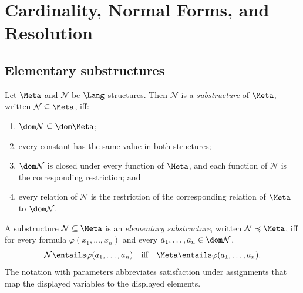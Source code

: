 \chapter{Cardinality, Normal Forms, and Resolution}
\label{ch:fol-cardinality-normalforms}

\section{Elementary substructures}
\label{sec:fol-cardinality-normalforms-01}

\begin{definition}[Substructure]
Let \(\Meta\) and \(\mathcal N\) be \(\Lang\)-structures.  Then
\(\mathcal N\) is a \emph{substructure} of \(\Meta\), written
\(\mathcal N\subseteq\Meta\), iff:
\begin{enumerate}
  \item \(\dom\mathcal N\subseteq\dom\Meta\);
  \item every constant has the same value in both structures;
  \item \(\dom\mathcal N\) is closed under every function of \(\Meta\),
        and each function of \(\mathcal N\) is the corresponding restriction;
        and
  \item every relation of \(\mathcal N\) is the restriction of the
        corresponding relation of \(\Meta\) to \(\dom\mathcal N\).
\end{enumerate}
\end{definition}

\begin{definition}
A substructure \(\mathcal N\subseteq\Meta\) is an \emph{elementary
substructure}, written \(\mathcal N\preccurlyeq\Meta\), iff for every formula
\(\varphi(x_1,\ldots,x_n)\) and every
\(a_1,\ldots,a_n\in\dom\mathcal N\),
\[
 \mathcal N\entails\varphi(a_1,\ldots,a_n)
 \quad\text{iff}\quad
 \Meta\entails\varphi(a_1,\ldots,a_n).
\]
The notation with parameters abbreviates satisfaction under assignments that
map the displayed variables to the displayed elements.
\end{definition}

